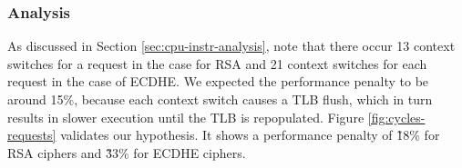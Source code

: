 \documentclass[../../../main.tex]{subfiles}
\begin{document}
\subsubsection*{Analysis}
As discussed in Section \ref{sec:cpu-instr-analysis}, note that there occur
13 context switches for a request in the case for RSA and 21 context switches
for each request in the case of ECDHE. We expected the performance penalty
to be around 15\%, because each context switch causes a TLB flush, which in
turn results in slower execution until the TLB is repopulated. Figure
\ref{fig:cycles-requests} validates our hypothesis. It shows a performance
penalty of \~18\% for RSA ciphers and \~33\% for ECDHE ciphers.

\end{document}
